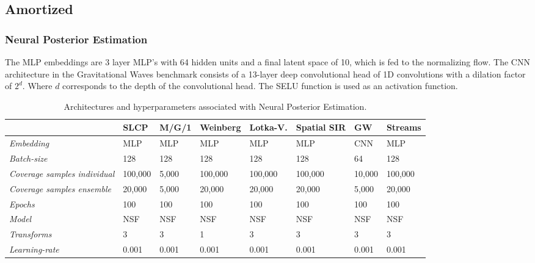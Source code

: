 \documentclass[twoside]{article}
\begin{document}
\subsection{Amortized}
\subsubsection{Neural Posterior Estimation}
The MLP embeddings are 3 layer MLP's with 64 hidden units and a final latent space of 10, which is fed to the normalizing flow.
The CNN architecture in the Gravitational Waves benchmark consists of a 13-layer deep convolutional head of 1D convolutions with a dilation factor of $2^d$. Where $d$ corresponds to the depth of the convolutional head. The SELU \citep{selu} function is used as an activation function.
\begin{table}[h!]
    \centering
    \begin{tabular}{llllllll}
        \toprule
        & SLCP & M/G/1 & Weinberg & Lotka-V. & Spatial SIR & GW & Streams \\
        \midrule
        \emph{Embedding} & MLP & MLP & MLP & MLP & MLP & CNN & MLP \\
        \emph{Batch-size} & 128 & 128 & 128 & 128 & 128 & 64 & 128 \\
        \emph{Coverage samples individual} & 100,000 & 5,000 & 100,000 & 100,000 & 100,000 & 10,000 & 100,000 \\
        \emph{Coverage samples ensemble} & 20,000 & 5,000 & 20,000 & 20,000 & 20,000 & 5,000 & 20,000 \\
        \emph{Epochs} & 100 & 100 & 100 & 100 & 100 & 100 & 100 \\
        \emph{Model} & NSF & NSF & NSF & NSF & NSF & NSF & NSF \\
        \emph{Transforms} & 3 & 3 & 1 & 3 & 3 & 3 & 3 \\
        \emph{Learning-rate} & 0.001 & 0.001 & 0.001 & 0.001 & 0.001 & 0.001 & 0.001 \\
        \bottomrule
    \end{tabular}
    \caption{Architectures and hyperparameters associated with Neural Posterior Estimation.}
    \label{tab:npe_hyperparameters}
\end{table}
\end{document}
